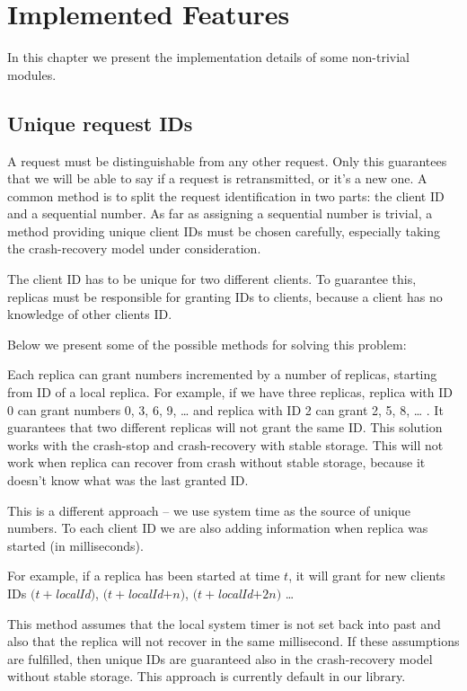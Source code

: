 \chapter{Implemented Features}

In this chapter we present the implementation details of some non-trivial modules.

\section{Unique request IDs}

A request must be distinguishable from any other request. Only this guarantees that we will be able to say if a request is retransmitted, or it's a new one. A common method is to split the request identification in two parts: the client ID and a sequential number. As far as assigning a sequential number is trivial, a method providing unique client IDs must be chosen carefully, especially taking the crash-recovery model under consideration.

The client ID has to be unique for two different clients. To guarantee this, replicas must be responsible for granting IDs to clients, because a client has no knowledge of other clients ID.

Below we present some of the possible methods for solving this problem:

Each replica can grant numbers incremented by a number of replicas, starting from ID of a local replica. For example, if we have three replicas, replica with ID 0 can grant numbers 0, 3, 6, 9, \ldots{} and replica with ID 2 can grant 2, 5, 8, \ldots{} . It guarantees that two different replicas will not grant the same ID. This solution works with the crash-stop and crash-recovery with stable storage. This will not work when replica can recover from crash without stable storage, because it doesn't know what was the last granted ID.

This is a different approach -- we use system time as the source of unique numbers. To each client ID we are also adding information when replica was started (in milliseconds).

For example, if a replica has been started at time $t$, it will grant for new clients IDs $(t + $\textit{localId}$)$, $(t + $\textit{localId}$ + n)$, $(t + $\textit{localId}$ + 2n)$ \ldots

This method assumes that the local system timer is not set back into past and also that the replica will not recover in the same millisecond. If these assumptions are fulfilled, then unique IDs are guaranteed also in the crash-recovery model without stable storage. This approach is currently default in our library.

